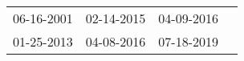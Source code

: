 \begin{supertabular}{llll}
 06-16-2001 &  02-14-2015 &  04-09-2016 \\
 01-25-2013 &  04-08-2016 &  07-18-2019 \\
\end{supertabular}
